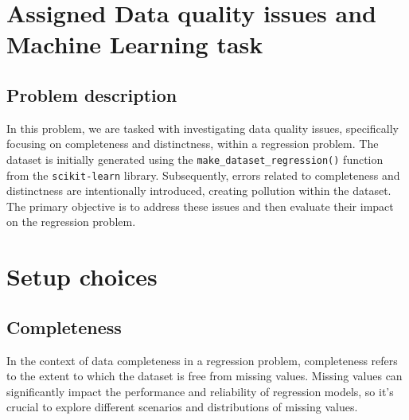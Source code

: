 \documentclass{Configuration_Files/PoliMi3i_thesis}
\begin{document}
\mainmatter %


\lstset{language=SQL, style=mystyle}


\chapter{Assigned Data quality issues and Machine Learning task}
\label{ch:chapter_1}%

\section{Problem description}
\label{sec:section_1_1}%
In this problem, we are tasked with investigating data quality issues, specifically focusing on completeness and distinctness, within a regression problem. The dataset is initially generated using the \verb|make_dataset_regression()| function from the \verb|scikit-learn| library. Subsequently, errors related to completeness and distinctness are intentionally introduced, creating pollution within the dataset. The primary objective is to address these issues and then evaluate their impact on the regression problem.

\chapter{Setup choices}
\label{ch:chapter_2}%

\section{Completeness}
\label{sec:section_2_1}%
In the context of data completeness in a regression problem, completeness refers to the extent to which the dataset is free from missing values. Missing values can significantly impact the performance and reliability of regression models, so it's crucial to explore different scenarios and distributions of missing values. 
\end{document}
